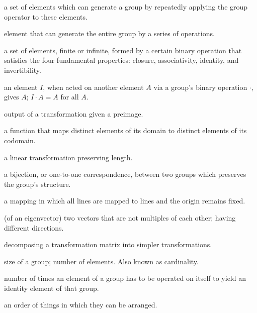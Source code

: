 \documentclass[../gatm.tex]{subfiles}
\begin{document}
\begin{description}[align=left]
\item[generating set] a set of elements which can generate a group by repeatedly applying the group operator to these elements.

\item[generator] element that can generate the entire group by a series of operations.

\item[group] a set of elements, finite or infinite, formed by a certain binary operation that satisfies the four fundamental properties: closure, associativity, identity, and invertibility.

\item[identity element] an element $I$, when acted on another element $A$ via a group's binary operation $\cdot$, gives $A$; $I\cdot A = A$ for all $A$.

\item[image] output of a transformation given a preimage.

\item[injective function] a function that maps distinct elements of its domain to distinct elements of its codomain.

\item[isometry] a linear transformation preserving length.

\item[isomorphism] a bijection, or one-to-one correspondence, between two groups which preserves the group's structure.

\item[linear mapping] a mapping in which all lines are mapped to lines and the origin remains fixed.

\item[linearly independent] (of an eigenvector) two vectors that are not multiples of each other; having different directions.

\item[matrix decomposition] decomposing a transformation matrix into simpler transformations.

\item[order] size of a group; number of elements. Also known as cardinality.

\item[period] number of times an element of a group has to be operated on itself to yield an identity element of that group.

\item[permutation] an order of things in which they can be arranged.


\end{description}
\end{document}
